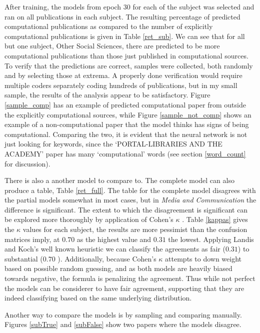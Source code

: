 \documentclass[12pt, a4paper]{article}
\begin{document}
After training, the models from epoch 30 for each of the subject was selected and ran on all publications in each subject. The resulting percentage of predicted computational publications as compared to the number of explicitly computational publications is given in Table \ref{ret_sub}. We can see that for all but one subject, Other Social Sciences, there are predicted to be more computational publications than those just published in computational sources. To verify that the predictions are correct, samples were collected, both randomly and by selecting those at extrema. A properly done verification would require multiple coders separately coding hundreds of publications, but in my small sample, the results of the analysis appear to be satisfactory. Figure \ref{sample_comp} has an example of predicted computational paper from outside the explicitly computational sources, while Figure \ref{sample_not_comp} shows an example of a non-computational paper that the model thinks has signs of being computational. Comparing the two, it is evident that the neural network is not just looking for keywords, since the `PORTAL-LIBRARIES AND THE ACADEMY' paper has many `computational' words (see section \ref{word_count} for discussion).

There is also a another model to compare to. The complete model can also produce a table, Table \ref{ret_full}. The table for the complete model disagrees with the partial models somewhat in most cases, but in \textit{Media and Communication} the difference is significant. The extent to which the disagreement is significant can be explored more thoroughly by application of Cohen's $\kappa$ \citep{cohen1960coefficient}. Table \ref{kappas} gives the $\kappa$ values for each subject, the results are more pessimist than the confusion matrices imply, at $0.70$ as the highest value and $0.31$ the lowest. Applying Landis and Koch's well known heuristic \citep{landis1977measurement} we can classify the agreements as fair ($0.31$) to substantial ($0.70$ ). Additionally, because Cohen's $\kappa$ attempts to down weight based on possible random guessing, and as both models are heavily biased towards negative, the formula is penalizing the agreement. Thus while not perfect the models can be considerer to have fair agreement, supporting that they are indeed classifying based on the same underlying distribution.

Another way to compare the models is by sampling and comparing manually. Figures \ref{subTrue} and \ref{subFalse} show two papers where the models disagree.
\end{document}
